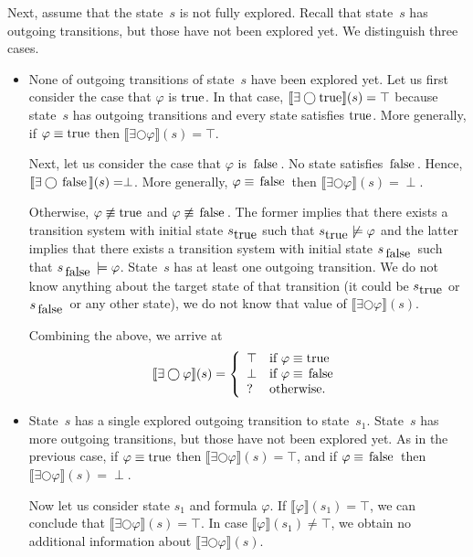 \documentclass[12pt]{article}
\newcommand{\nxt}{\bigcirc}
\newcommand{\TRUE}{\mbox{\lstinline{true}}}
\newcommand{\FALSE}{\mbox{\lstinline{false}}}
\theoremstyle{definition}
\newcommand{\satisfaction}[1]{\llbracket #1 \rrbracket}
\begin{document}
Next, assume that the state~$s$ is not fully explored.  Recall that state~$s$ has outgoing transitions, but those have not been explored yet.  We distinguish three cases.
\begin{itemize}
\item 
None of outgoing transitions of state~$s$ have been explored yet.  Let us first consider the case that $\varphi$ is $\TRUE$.  In that case, $\satisfaction{\exists \nxt \TRUE}(s) = \top$ because state~$s$ has outgoing transitions and every state satisfies $\TRUE$.  More generally, if $\varphi \equiv \TRUE$ then $\satisfaction{\exists \nxt \varphi}(s) = \top$.

Next, let us consider the case that $\varphi$ is $\FALSE$.  No state satisfies $\FALSE$.  Hence, $\satisfaction{\exists \nxt \FALSE}(s) = \perp$.  More generally, $\varphi \equiv \FALSE$ then $\satisfaction{\exists \nxt \varphi}(s) = \perp$.

Otherwise, $\varphi \not\equiv \TRUE$ and $\varphi \not\equiv \FALSE$.  The former implies that there exists a transition system with initial state $s_{\TRUE}$ such that $s_{\TRUE} \not\models \varphi$ and the latter implies that there exists a transition system with initial state $s_{\FALSE}$ such that $s_{\FALSE} \models \varphi$.  State~$s$ has at least one outgoing transition.  We do not know anything about the target state of that transition (it could be $s_{\TRUE}$ or $s_{\FALSE}$ or any other state), we do not know that value of $\satisfaction{\exists \nxt \varphi}(s)$.

Combining the above, we arrive at
\[
\satisfaction{\exists \nxt \varphi}(s) = \left \{
\begin{array}{ll}
\top & \mbox{if $\varphi \equiv \TRUE$}\\
\perp & \mbox{if $\varphi \equiv \FALSE$}\\
? & \mbox{otherwise.}
\end{array}
\right .
\]
\item
State~$s$ has a single explored outgoing transition to state~$s_1$.  State~$s$ has more outgoing transitions, but those have not been explored yet.   As in the previous case, if  $\varphi \equiv \TRUE$ then $\satisfaction{\exists \nxt \varphi}(s) = \top$, and if $\varphi \equiv \FALSE$ then $\satisfaction{\exists \nxt \varphi}(s) = \perp$.

Now let us consider state $s_1$ and formula $\varphi$.  If $\satisfaction{\varphi}(s_1) = \top$, we can conclude that $\satisfaction{\exists \nxt \varphi}(s) = \top$.  In case $\satisfaction{\varphi}(s_1)\not= \top$, we obtain no additional information about $\satisfaction{\exists \nxt \varphi}(s)$.


\end{itemize}
\end{document}
